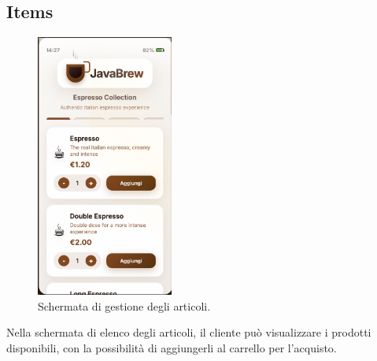 \subsection{Items}  
\begin{figure}[H]
    \centering
    \includegraphics[width=0.4\textwidth]{./assets/items.png}
    \caption{Schermata di gestione degli articoli.}
\end{figure}
Nella schermata di elenco degli articoli, il cliente può visualizzare i prodotti disponibili, con la possibilità di aggiungerli al carrello per l'acquisto. 